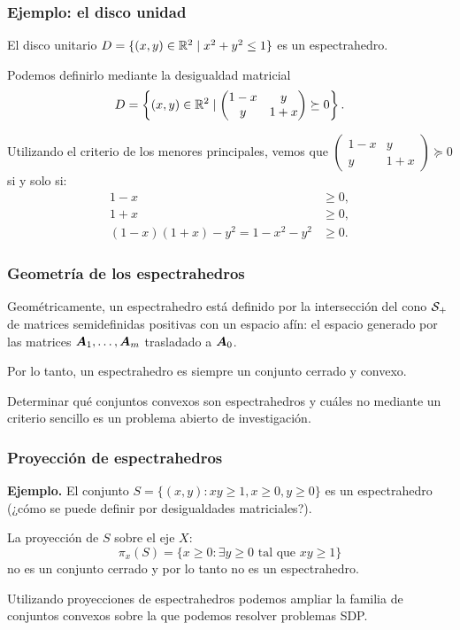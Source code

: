 \documentclass[aspectratio=169,12pt,spanish]{beamer}
\begin{document}

\begin{frame}
\frametitle{Ejemplo: el disco unidad}

El disco unitario $D = \{(x,y) \in \mathbb{R}^2 \mid x^2 + y^2 \le 1\}$ es un espectrahedro.

Podemos definirlo mediante la desigualdad matricial \pause
$$
D = \left\{(x,y) \in \mathbb{R}^2 \mid \begin{pmatrix} 1-x & y \\ y & 1+x \end{pmatrix} \succeq 0\right\}.
$$

Utilizando el criterio de los menores principales, vemos que $\begin{pmatrix} 1-x & y \\ y & 1+x \end{pmatrix} \succeq 0$ si y solo si:
$$
\begin{aligned}
1-x &\ge 0, \\
1+x &\ge 0, \\
(1-x)(1+x)-y^2 = 1 - x^2 - y^2 &\ge 0.
\end{aligned}
$$

\end{frame}


\begin{frame}
\frametitle{Geometría de los espectrahedros}

Geométricamente, un espectrahedro está definido por la intersección del cono ${\mathcal S_+}$ de matrices semidefinidas positivas con un espacio afín: el espacio generado por las matrices $\bm{A}_1, \dots, \bm{A}_m$ trasladado a $\bm{A}_0$.

Por lo tanto, un espectrahedro es siempre un conjunto cerrado y convexo.

Determinar qué conjuntos convexos son espectrahedros y cuáles no mediante un criterio sencillo es un problema abierto de investigación.

\end{frame}


\begin{frame}
\frametitle{Proyección de espectrahedros}

\textbf{Ejemplo.}
El conjunto $S = \{(x,y): xy \ge 1, x \ge 0, y \ge 0\}$ es un espectrahedro (¿cómo se puede definir por desigualdades matriciales?).

La proyección de $S$ sobre el eje $X$:
$$
\pi_x(S) = \{x \ge 0 : \exists y \ge 0 \text{ tal que } xy \ge 1\}
$$
no es un conjunto cerrado y por lo tanto no es un espectrahedro.

Utilizando proyecciones de espectrahedros podemos ampliar la familia de conjuntos convexos sobre la que podemos resolver problemas SDP.
\end{frame}
\end{document}

